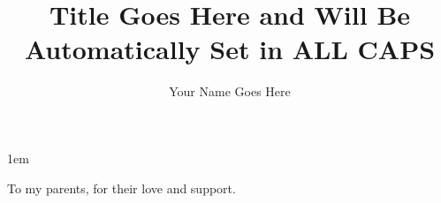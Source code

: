 \documentclass[fancy,tocnosub,noragright,centerchapter,fullpagesingle,12pt]{uiuc_csthesis18}
\title{Title Goes Here and Will Be Automatically Set in ALL CAPS}
\author{Your Name Goes Here}
\begin{document}
%

%
\maketitle

\parindent 1em%

\frontmatter

%
\begin{abstract}

\end{abstract}


%
\begin{dedication}
To my parents, for their love and support.
\end{dedication}

%
\begin{acknowledgments}
%
\end{acknowledgments}

%
\tableofcontents

\mainmatter

%






%
%

\backmatter

%


%



\end{document}
